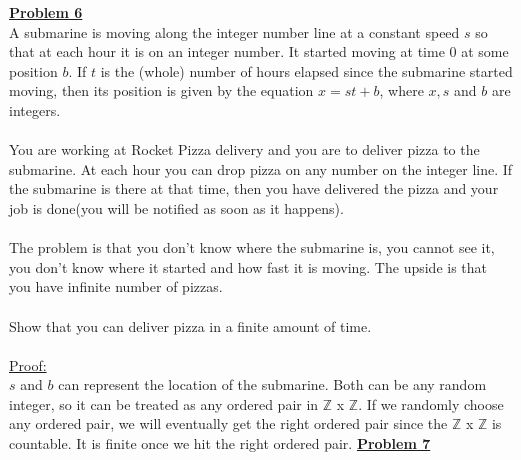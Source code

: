 \documentclass[11pt]{article}
\begin{document}
\newpage
\noindent\textbf{\underline{Problem 6}}\\
	A submarine is moving along the integer number line at a constant speed $s$ so that at each hour it is on an integer number. It started moving at time 0 at some position $b$. If $t$ is the (whole) number of hours elapsed since the submarine started moving, then its position is given by the equation $x=st+b$, where $x,s$ and $b$ are integers. \\\\
You are working at Rocket Pizza delivery and you are to deliver pizza to the submarine. At each hour you can drop pizza on any number on the integer line. If the submarine is there at that time, then you have delivered the pizza and your job is done(you will be notified as soon as it happens). \\\\
The problem is that you don't know where the submarine is, you cannot see it, you don't know where it started and how fast it is moving. The upside is that you have infinite number of pizzas. \\\\
Show that you can deliver pizza in a finite amount of time. \\\\

\underline{Proof:} \\

$s$ and $b$ can represent the location of the submarine. Both can be any random integer, so it can be treated as any ordered pair in $\mathbb{Z}$ x $\mathbb{Z}$. If we randomly choose any ordered pair, we will eventually get the right ordered pair since the $\mathbb{Z}$ x $\mathbb{Z}$ is countable. It is finite once we hit the right ordered pair.
\newpage
\noindent\textbf{\underline{Problem 7}}\\
\end{document}
